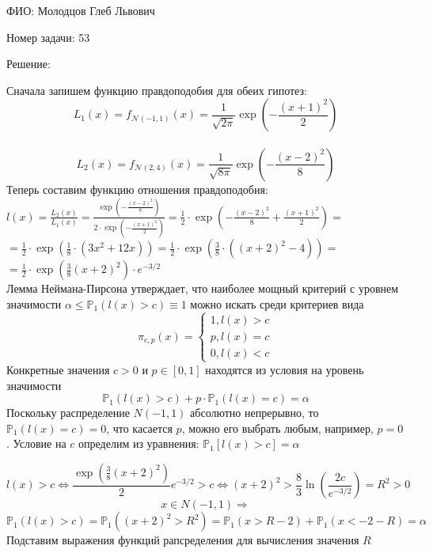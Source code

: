 \documentclass[14pt]{extarticle}
\begin{document}
ФИО: Молодцов Глеб Львович

\vspace{10pt}

Номер задачи: 53

\vspace{10pt}

Решение:

\vspace{10pt}
Сначала запишем функцию правдоподобия для обеих гипотез: \\
$$L_1(x) = f_{\mathcal{N}(-1,1)}(x) = \frac{1}{\sqrt{2\pi}}\exp\left(-\frac{(x + 1)^2}{2}\right)$$\\
$$L_2(x) = f_{\mathcal{N}(2,4)}(x) = \frac{1}{\sqrt{8\pi}}\exp\left(-\frac{(x - 2)^2}{8}\right)$$
Теперь составим функцию отношения правдоподобия: \\
$ l(x)=\frac{L_2(x)}{L_1(x)}=\frac{\exp\left(-\frac{(x - 2)^2}{8}\right)}{2\cdot \exp\left(-\frac{(x + 1)^2}{2}\right)}= \frac{1}{2} \cdot \exp \left(-\frac{(x-2)^2}{8}+\frac{(x+1)^2}{2}\right) = $\\ $=  \frac{1}{2} \cdot \exp \left(\frac{1}{8} \cdot\left(3 x^2+12 x\right)\right)= \frac{1}{2} \cdot \exp \left(\frac{3}{8} \cdot\left(\left(x+2\right)^2-4\right)\right)=$\\$ = \frac{1}{2}\cdot \exp \left(\frac{3}{8}(x+2)^2\right) \cdot e^{-3 / 2} 
$
\\
Лемма Неймана-Пирсона утверждает, что наиболее мощный критерий с уровнем значимости $\alpha \leq \mathbb{P}_1(l(x) > c) \equiv 1$ можно искать среди критериев вида
$$
\pi_{c, p}(x)=\left\{\begin{array}{l}
1, l(x)>c \\
p, l(x)=c \\
0, l(x)<c
\end{array}\right.
$$
Конкретные значения $c > 0 $ и $p \in [0,1]$ находятся из условия на уровень значимости 
$$
\mathbb{P}_1(l(x)>c)+p \cdot \mathbb{P}_1(l(x)=c)=\alpha
$$
Поскольку распределение $N(-1,1)$ абсолютно непрерывно, то \\ $\mathbb{P}_1(l(x)=c)=0$, что касается $p$, можно его выбрать любым, например, $p=0$. Условие на  $c$ определим из уравнения: $\mathbb{P}_1[l(x)>c]=\alpha$

$$
l(x)>c  \Leftrightarrow  \frac{\exp \left(\frac{3}{8}(x+2)^2\right)}{2}e^{-3 / 2}  >c \Leftrightarrow (x+2)^2>\frac{8}{3} \ln \left(\frac{2c}{e^{-3 / 2}} \right)=R^2>0
$$
$$x \in N(-1,1) \Longrightarrow $$
$$
\mathbb{P}_1(l(x)>c)=\mathbb{P}_1\left((x+2)^2>R^2\right)=\mathbb{P}_1(x>R-2)+\mathbb{P}_1(x<-2-R)=\alpha
$$
Подставим выражения функций рапсределения для вычисления значения $R$
\end{document}
